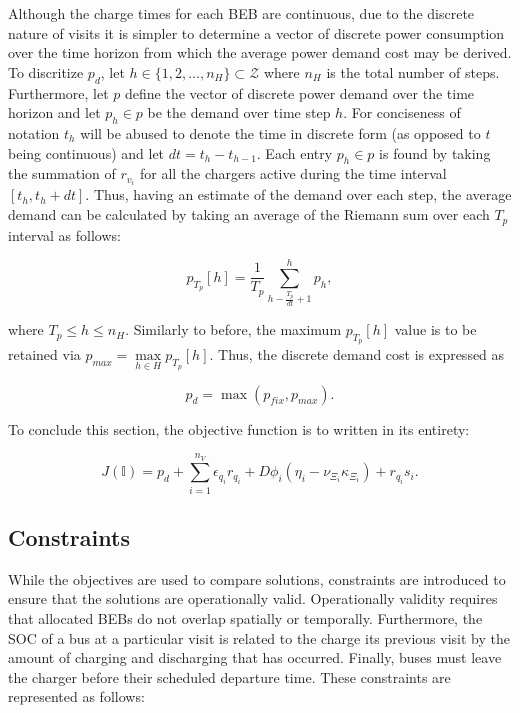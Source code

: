\documentclass[energies,article,submit,moreauthors]{Definitions/mdpi}
\newcommand{\I}{\mathbb{I}}                 %
\begin{document}
Although the charge times for each BEB are continuous, due to the discrete nature of visits it is simpler to determine a
vector of discrete power consumption over the time horizon from which the average power demand cost may be derived. To
discritize \(p_d\), let \(h \in \{ 1, 2, ..., n_H \} \subset \mathcal{Z}\) where \(n_H\) is the total number of steps. Furthermore, let \(p\)
define the vector of discrete power demand over the time horizon and let \(p_h \in p\) be the demand over time step \(h\). For
conciseness of notation \(t_h\) will be abused to denote the time in discrete form (as opposed to \(t\) being continuous)
and let \(dt = t_h - t_{h-1}\). Each entry \(p_h \in p\) is found by taking the summation of \(r_{v_i}\) for all the chargers
active during the time interval \([t_h, t_h + dt]\). Thus, having an estimate of the demand over each step, the average
demand can be calculated by taking an average of the Riemann sum over each \(T_p\) interval as follows:

\begin{equation}
p_{T_p}[h] = \frac{1}{T_p} \sum_{h-\frac{T_p}{dt}+1}^h p_h,
\end{equation}

where \(T_p \le h \le n_H\). Similarly to before, the maximum \(p_{T_p}[h]\) value is to be retained via \(p_{max} =
\max\limits_{h \in H}p_{T_p}[h]\). Thus, the discrete demand cost is expressed as

\begin{equation}
\label{eq:pd-dis}
  p_d = \max(p_{fix}, p_{max})\text{.}
\end{equation}

To conclude this section, the objective function is to written in its entirety:

\begin{equation}
\label{eq:objective-function}
  J(\I) = p_d + \sum_{i=1}^{n_V} \epsilon_{q_i}r_{q_i} + D \phi_i(\eta_i - \nu_{\Xi_i} \kappa_{\Xi_i}) + r_{q_i}s_i\text{.}
\end{equation}

\subsection{Constraints}
\label{sec:constraints}
While the objectives are used to compare solutions, constraints are introduced to ensure that the solutions are
operationally valid. Operationally validity requires that allocated BEBs do not overlap spatially or temporally.
Furthermore, the SOC of a bus at a particular visit is related to the charge its previous visit by the amount of
charging and discharging that has occurred. Finally, buses must leave the charger before their scheduled departure time.
These constraints are represented as follows:
\end{document}
